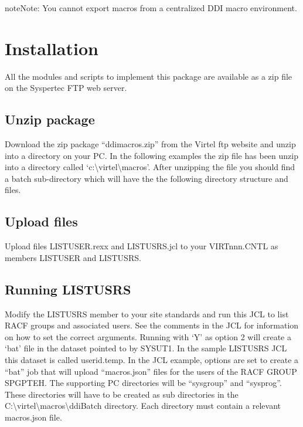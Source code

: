 \documentclass[letterpaper,10pt,english]{sphinxmanual}
\begin{document}
\begin{sphinxadmonition}{note}{Note:}
You cannot export macros from a centralized DDI macro environment.
\end{sphinxadmonition}


\chapter{Installation}
\label{\detokenize{TN201903:installation}}
All the modules and scripts to implement this package are available as a zip file on the Syspertec FTP web server.


\section{Unzip package}
\label{\detokenize{TN201903:unzip-package}}
Download the zip package “ddimacros.zip” from the Virtel ftp website and unzip into a directory on your PC. In the following examples the zip file has been unzip into a directory called ‘c:\textbackslash{}virtel\textbackslash{}macros’. After unzipping the file you should find a batch sub-directory which will have the the following directory structure and files.

\begin{sphinxVerbatim}[commandchars=\\\{\}]
\PYGZbs{}
\PYGZbs{}
\PYGZbs{}
\PYGZbs{}
\PYGZbs{}
\end{sphinxVerbatim}


\section{Upload files}
\label{\detokenize{TN201903:upload-files}}
Upload files LISTUSER.rexx and LISTUSRS.jcl to your VIRTnnn.CNTL as members LISTUSER and LISTUSRS.


\section{Running LISTUSRS}
\label{\detokenize{TN201903:running-listusrs}}
Modify the LISTUSRS member to your site standards and run this JCL to list RACF groups and associated users. See the comments in the JCL for information on how to set the correct arguments. Running with ‘Y’ as option 2 will create a ‘bat’ file in the dataset pointed to by SYSUT1. In the sample LISTUSRS JCL this dataset is called userid.temp. In the JCL example, options are set to create a “bat” job that will upload “macros.json” files for the users of the RACF GROUP SPGPTEH. The supporting PC directories will be “sysgroup” and “sysprog”. These directories will have to be created as sub directories in the C:\textbackslash{}virtel\textbackslash{}macros\textbackslash{}ddiBatch directory. Each directory must contain a relevant macros.json file.
\end{document}
